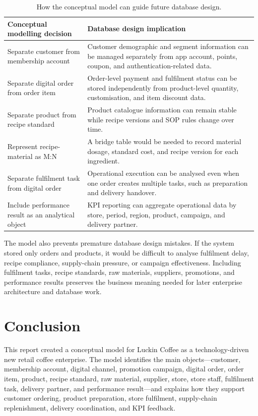 \documentclass[12pt,a4paper]{article}
\begin{document}
\begin{table}[H]
\centering
\caption{How the conceptual model can guide future database design.}
\begin{tabularx}{\textwidth}{P{4.1cm}Y}
\toprule
\textbf{Conceptual modelling decision} & \textbf{Database design implication} \\
\midrule
Separate customer from membership account & Customer demographic and segment information can be managed separately from app account, points, coupon, and authentication-related data. \\
Separate digital order from order item & Order-level payment and fulfilment status can be stored independently from product-level quantity, customisation, and item discount data. \\
Separate product from recipe standard & Product catalogue information can remain stable while recipe versions and SOP rules change over time. \\
Represent recipe-material as M:N & A bridge table would be needed to record material dosage, standard cost, and recipe version for each ingredient. \\
Separate fulfilment task from digital order & Operational execution can be analysed even when one order creates multiple tasks, such as preparation and delivery handover. \\
Include performance result as an analytical object & KPI reporting can aggregate operational data by store, period, region, product, campaign, and delivery partner. \\
\bottomrule
\end{tabularx}
\end{table}

The model also prevents premature database design mistakes. If the system stored only orders and products, it would be difficult to analyse fulfilment delay, recipe compliance, supply-chain pressure, or campaign effectiveness. Including fulfilment tasks, recipe standards, raw materials, suppliers, promotions, and performance results preserves the business meaning needed for later enterprise architecture and database work.

\section{Conclusion}

This report created a conceptual model for Luckin Coffee as a technology-driven new retail coffee enterprise. The model identifies the main objects---customer, membership account, digital channel, promotion campaign, digital order, order item, product, recipe standard, raw material, supplier, store, store staff, fulfilment task, delivery partner, and performance result---and explains how they support customer ordering, product preparation, store fulfilment, supply-chain replenishment, delivery coordination, and KPI feedback.
\end{document}
